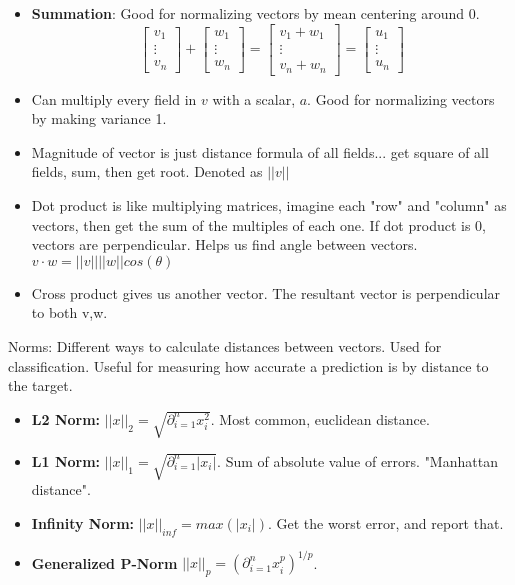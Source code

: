 \documentclass{article}
\begin{document}
\begin{itemize}

    \item \textbf{Summation}: Good for normalizing vectors by mean centering around 0.
    $$\begin{bmatrix}
    v_1\\ \vdots \\ v_n
    \end{bmatrix} + \begin{bmatrix}
    w_1\\ \vdots \\ w_n
    \end{bmatrix} = \begin{bmatrix}
    v_1 + w_1\\ \vdots \\ v_n + w_n
    \end{bmatrix} = \begin{bmatrix}
    u_1\\ \vdots \\ u_n
    \end{bmatrix}$$
    \item Can multiply every field in $v$ with a scalar, $a$. Good for normalizing vectors by making variance 1.
    \item Magnitude of vector is just distance formula of all fields... get square of all fields, sum, then get root. Denoted as $||v||$
    \item Dot product is like multiplying matrices, imagine each "row" and "column" as vectors, then get the sum of the multiples of each one. If dot product is 0, vectors are perpendicular. Helps us find angle between vectors. $v \cdot w = ||v||||w||cos(\theta)$
    \item Cross product gives us another vector. The resultant vector is perpendicular to both v,w. 
\end{itemize}
Norms: Different ways to calculate distances between vectors. Used for classification. Useful for measuring how accurate a prediction is by distance to the target.
\begin{itemize}
    \item \textbf{L2 Norm:} $||x||_2 = \sqrt{\partial^n_{i=1}x_i^2}$. Most common, euclidean distance.
    \item \textbf{L1 Norm:} $||x||_1 = \sqrt{\partial^n_{i=1}|x_i|}$. Sum of absolute value of errors. "Manhattan distance".
    \item \textbf{Infinity Norm:} $||x||_{inf} = max(|x_i|)$. Get the worst error, and report that. 
    \item \textbf{Generalized P-Norm} $||x||_p = (\partial^n_{i=1}x_i^p)^{1/p}$.
\end{itemize}
\end{document}
